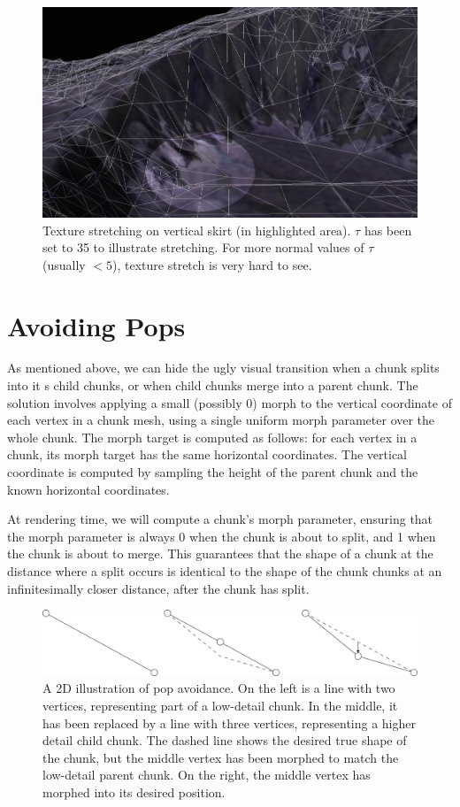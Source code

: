 \documentclass[12pt]{article}
\begin{document}
\begin{figure}[h]
\centering
\includegraphics[width=6in]{sig-fig-stretch}
\caption{ Texture stretching on vertical skirt (in highlighted area).
$\tau$ has been set to 35 to illustrate stretching.  For more
normal values of $\tau$ (usually $< 5$), texture stretch is very
hard to see. }
\label{fig:stretch}
\end{figure}

\section{Avoiding Pops}

As mentioned above, we can hide the ugly visual transition when a
chunk splits into it s child chunks, or when child chunks merge into a
parent chunk.  The solution involves applying a small (possibly 0)
morph to the vertical coordinate of each vertex in a chunk mesh, using
a single uniform morph parameter over the whole chunk.  The morph
target is computed as follows: for each vertex in a chunk, its morph
target has the same horizontal coordinates.  The vertical coordinate
is computed by sampling the height of the parent chunk and the known
horizontal coordinates.
 
At rendering time, we will compute a chunk's morph parameter, ensuring
that the morph parameter is always 0 when the chunk is about to split,
and 1 when the chunk is about to merge.  This guarantees that the
shape of a chunk at the distance where a split occurs is identical to
the shape of the chunk chunks at an infinitesimally closer distance,
after the chunk has split.


\begin{figure}[h]
\includegraphics[width=6in]{sig-fig-pop-avoid}
\caption{A 2D illustration of pop avoidance.  On the left is a line
with two vertices, representing part of a low-detail chunk.  In the
middle, it has been replaced by a line with three vertices,
representing a higher detail child chunk.  The dashed line shows the
desired true shape of the chunk, but the middle vertex has been
morphed to match the low-detail parent chunk.  On the right, the
middle vertex has morphed into its desired position.}
\label{fig:pop-avoid}
\end{figure}
\end{document}

